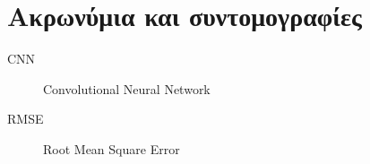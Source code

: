 \chapter{Ακρωνύμια και συντομογραφίες}

\begin{description}
  \item[CNN] Convolutional Neural Network
\end{description}
\begin{description}
  \item[RMSE] Root Mean Square Error
\end{description}
